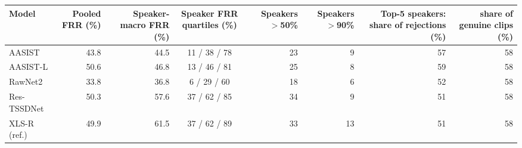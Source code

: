 \begin{tabular}{@{}lrrcrrrr@{}}
\toprule
Model & Pooled FRR (\%) & Speaker-macro FRR (\%) & Speaker FRR quartiles (\%) & Speakers $>$50\% & Speakers $>$90\% & Top-5 speakers: share of rejections (\%) & share of genuine clips (\%) \\
\midrule
AASIST & 43.8 & 44.5 & 11 / 38 / 78 & 23 & 9 & 57 & 58 \\
AASIST-L & 50.6 & 46.8 & 13 / 46 / 81 & 25 & 8 & 59 & 58 \\
RawNet2 & 33.8 & 36.8 & 6 / 29 / 60 & 18 & 6 & 52 & 58 \\
Res-TSSDNet & 50.3 & 57.6 & 37 / 62 / 85 & 34 & 9 & 51 & 58 \\
XLS-R (ref.) & 49.9 & 61.5 & 37 / 62 / 89 & 33 & 13 & 51 & 58 \\
\bottomrule
\end{tabular}
